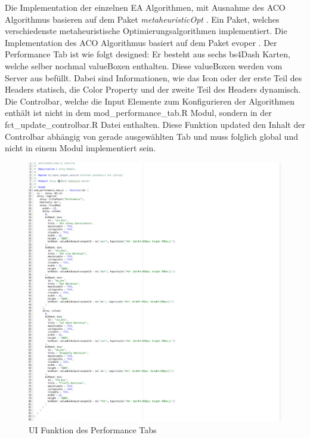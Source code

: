 Die Implementation der einzelnen EA Algorithmen, mit Ausnahme des ACO Algorithmus basieren auf dem Paket \emph{metaheuristicOpt} \citep{Riza2019}. Ein Paket, welches verschiedenste metaheuristische Optimierungsalgorithmen implementiert. \newline 
Die Implementation des ACO Algorithmus basiert auf dem Paket evoper \cite{Garcia2018}.
Der Performance Tab ist wie folgt designed: Er besteht aus sechs bs4Dash Karten, welche selber nochmal valueBoxen enthalten. Diese valueBoxen werden vom Server aus befüllt. Dabei sind Informationen, wie das Icon oder der erste Teil des Headers statisch, die Color Property und der zweite Teil des Headers dynamisch. \newline 
Die Controlbar, welche die Input Elemente zum Konfigurieren der Algorithmen enthält ist nicht in dem mod\_performance\_tab.R Modul, sondern in der fct\_update\_controlbar.R Datei enthalten. Diese Funktion updated den Inhalt der Controlbar abhängig von gerade ausgewählten Tab und muss folglich global und nicht in einem Modul implementiert sein. \newline 

\begin{figure}[h]
 \centering
 \includegraphics[scale=0.4]{"images/06_Performancevergleich/ui_performance_tab.png"}
 \caption{UI Funktion des Performance Tabs}
 \label{fig:ui_performance_tab}
\end{figure}

